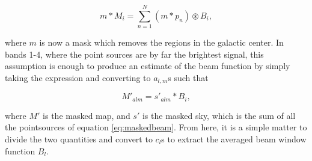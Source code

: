 \documentclass{aa}
\begin{document}
\begin{equation}
m * M_i = \sum_{n=1}^{N} (m*p_n) \circledast B_i,
\label{eq:maskedbeam}
\end{equation}

where $m$ is now a mask which removes the regions in the galactic center. In bands 1-4, where the point sources are by far the brightest signal, this assumption is enough to produce an estimate of the beam function by simply taking the expression and converting to $a_{l,m}$s such that

\begin{equation}
M'_{alm} = s'_{alm} * B_i,
\label{eq:maskedbeam}
\end{equation}

where $M'$ is the masked map, and $s'$ is the masked sky, which is the sum of all the pointsources of equation \ref{eq:maskedbeam}. From here, it is a simple matter to divide the two quantities and convert to $c_l$s to extract the averaged beam window function $B_l$.
\end{document}
